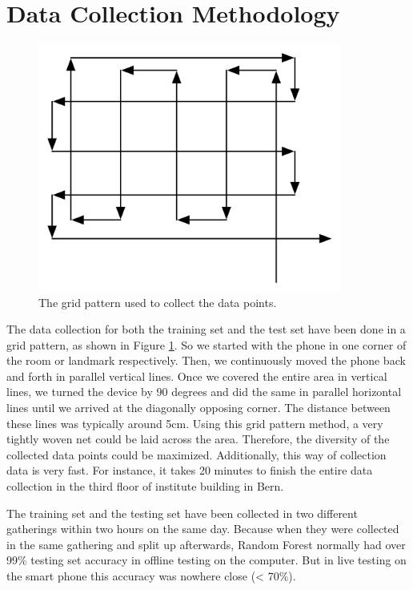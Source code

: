 
\section{Data Collection Methodology}
\label{sec:DataCollection}

\begin{figure}[H]
\centering
\includegraphics[width=100mm]{Figures/Grid.jpg}
\decoRule
\caption[Grid]{The grid pattern used to collect the data points.}
\label{fig:Grid}
\end{figure}
The data collection for both the training set and the test set have been done in a grid pattern, as shown in Figure \ref{fig:Grid}. So we started with the phone in one corner of the room or landmark respectively. Then, we continuously moved the phone back and forth in parallel vertical lines. Once we covered the entire area in vertical lines, we turned the device by 90 degrees and did the same in parallel horizontal lines until we arrived at the diagonally opposing corner. The distance between these lines was typically around 5cm. Using this grid pattern method, a very tightly woven net could be laid across the area. Therefore, the diversity of the collected data points could be maximized. Additionally, this way of collection data is very fast. For instance, it takes 20 minutes to finish the entire data collection in the third floor of institute building in Bern.

The training set and the testing set have been collected in two different gatherings within two hours on the same day. Because when they were collected in the same gathering and split up afterwards, Random Forest normally had over 99\% testing set accuracy in offline testing on the computer. But in live testing on the smart phone this accuracy was nowhere close (< 70\%). %

